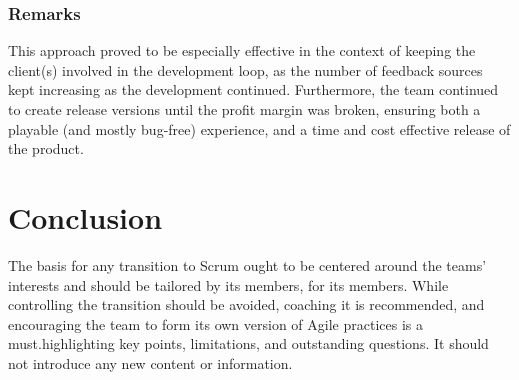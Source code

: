 \documentclass{scrartcl}
\begin{document}
    \subsubsection{Remarks}
    
    This approach proved to be especially effective in the context of keeping the client(s) involved in the development loop, as the number of feedback sources kept increasing as the development continued. Furthermore, the team continued to create release versions until the profit margin was broken, ensuring both a playable (and mostly bug-free) experience, and a time and cost effective release of the product.
    
    \section{Conclusion}
    
    The basis for any transition to Scrum ought to be centered around the teams' interests and should be tailored by its members, for its members. While controlling the transition should be avoided, coaching it is recommended, and encouraging the team to form its own version of Agile practices is a must.highlighting key points, limitations, and outstanding questions. It should not introduce any new content or information.



\end{document}
